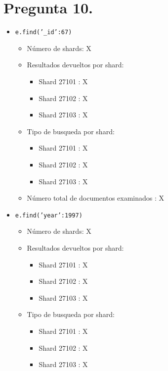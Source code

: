 \documentclass{article}
\begin{document}
  \section{Pregunta 10.}
    \begin{itemize}
      \item \texttt{e.find({'\_id':67})}
        \begin{itemize}
          \item Número de shards: X
          \item Resultados devueltos por shard:
            \begin{itemize}
              \item Shard 27101 : X
              \item Shard 27102 : X
              \item Shard 27103 : X
            \end{itemize}
          \item Tipo de busqueda por shard:
            \begin{itemize}
              \item Shard 27101 : X
              \item Shard 27102 : X
              \item Shard 27103 : X
            \end{itemize}
          \item Número total de documentos examinados : X
        \end{itemize}
      \item \texttt{e.find({'year':1997})}
        \begin{itemize}
          \item Número de shards: X
          \item Resultados devueltos por shard:
            \begin{itemize}
              \item Shard 27101 : X
              \item Shard 27102 : X
              \item Shard 27103 : X
            \end{itemize}
          \item Tipo de busqueda por shard:
            \begin{itemize}
              \item Shard 27101 : X
              \item Shard 27102 : X
              \item Shard 27103 : X
            \end{itemize}

\end{itemize}
\end{itemize}
\end{document}
